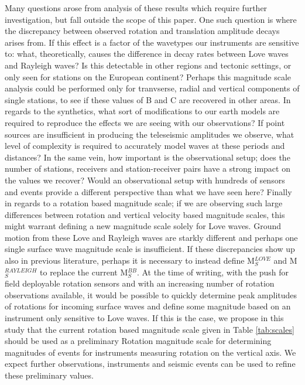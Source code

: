 \documentclass{gji}
\begin{document}
Many questions arose from analysis of these results which require further investigation, but fall outside the scope of this paper. One such question is where the discrepancy between observed rotation and translation amplitude decays arises from. If  this effect is a factor of the wavetypes our instruments are sensitive to: what, theoretically, causes the difference in decay rates between Love waves and Rayleigh waves? Is this detectable in other regions and tectonic settings, or only seen for stations on the European continent? Perhaps this magnitude scale analysis could be performed only for tranvserse, radial and vertical components of single stations, to see if these values of B and C are recovered in other areas. In regards to the synthetics, what sort of modifications to our earth models are required to reproduce the effects we are seeing with our observations? If point sources are insufficient in producing the teleseismic amplitudes we observe, what level of complexity is required to accurately model waves at these periods and distances? In the same vein, how important is the observational setup; does the number of stations, receivers and station-receiver pairs have a strong impact on the values we recover? Would an observational setup with hundreds of sensors and events provide a different perspective than what we have seen here? Finally in regards to a rotation based magnitude scale; if we are observing such large differences between rotation and vertical velocity based magnitude scales, this might warrant defining a new magnitude scale solely for Love waves. Ground motion from these Love and Rayleigh waves are starkly different and perhaps one single surface wave magnitude scale is insufficient. If these discrepancies show up also in previous literature, perhaps it is necessary to instead define M$_S^{LOVE}$ and M$_S^{RAYLEIGH}$ to replace the current M$_S^{BB}$. At the time of writing, with the push for field deployable rotation sensors and with an increasing number of rotation observations available, it would be possible to quickly determine peak amplitudes of rotations for incoming surface waves and define some magnitude based on an instrument only sensitive to Love waves. If this is the case, we propose in this study that the current rotation based magnitude scale given in Table \ref{tab:scales} should be used as a preliminary Rotation magnitude scale for determining magnitudes of events for instruments measuring rotation on the vertical axis. We expect further observations, instruments and seismic events can be used to refine these preliminary values.
\end{document}
